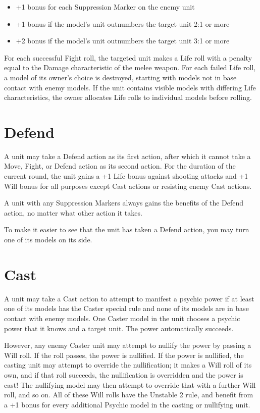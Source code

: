 \begin{multicols}{2}
\begin{itemize}
 \item +1 bonus for each Suppression Marker on the enemy unit
 \item +1 bonus if the model's unit outnumbers the target unit 2:1 or more
 \item +2 bonus if the model's unit outnumbers the target unit 3:1 or more
\end{itemize}

For each successful Fight roll, the targeted unit makes a Life roll with a penalty equal to the Damage characteristic of the melee weapon. For each failed Life roll, a model of its owner's choice is destroyed, starting with models not in base contact with enemy models. If the unit contains visible models with differing Life characteristics, the owner allocates Life rolls to individual models before rolling.




\section*{Defend}
A unit may take a Defend action as its first action, after which it cannot take a Move, Fight, or Defend action as its second action. For the duration of the current round, the unit gains a +1 Life bonus against shooting attacks and +1 Will bonus for all purposes except Cast actions or resisting enemy Cast actions.

A unit with any Suppression Markers always gains the benefits of the Defend action, no matter what other action it takes.

To make it easier to see that the unit has taken a Defend action, you may turn one of its models on its side.




\section*{Cast}
A unit may take a Cast action to attempt to manifest a psychic power if at least one of its models has the Caster special rule and none of its models are in base contact with enemy models. One Caster model in the unit chooses a psychic power that it knows and a target unit. The power automatically succeeds.

However, any enemy Caster unit may attempt to nullify the power by passing a Will roll. If the roll passes, the power is nullified. If the power is nullified, the casting unit may attempt to override the nullification; it makes a Will roll of its own, and if that roll succeeds, the nullification is overridden and the power is cast! The nullifying model may then attempt to override that with a further Will roll, and so on. All of these Will rolls have the Unstable 2 rule, and benefit from a +1 bonus for every additional Psychic model in the casting or nullifying unit.


\end{multicols}
